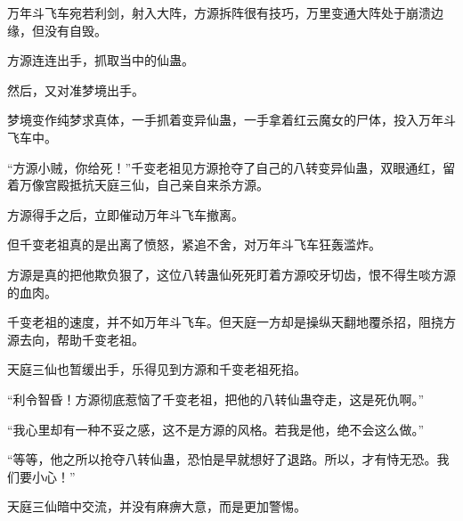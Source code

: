 \begin{this_body}
万年斗飞车宛若利剑，射入大阵，方源拆阵很有技巧，万里变通大阵处于崩溃边缘，但没有自毁。

方源连连出手，抓取当中的仙蛊。

然后，又对准梦境出手。

梦境变作纯梦求真体，一手抓着变异仙蛊，一手拿着红云魔女的尸体，投入万年斗飞车中。

“方源小贼，你给死！”千变老祖见方源抢夺了自己的八转变异仙蛊，双眼通红，留着万像宫殿抵抗天庭三仙，自己亲自来杀方源。

方源得手之后，立即催动万年斗飞车撤离。

但千变老祖真的是出离了愤怒，紧追不舍，对万年斗飞车狂轰滥炸。

方源是真的把他欺负狠了，这位八转蛊仙死死盯着方源咬牙切齿，恨不得生啖方源的血肉。

千变老祖的速度，并不如万年斗飞车。但天庭一方却是操纵天翻地覆杀招，阻挠方源去向，帮助千变老祖。

天庭三仙也暂缓出手，乐得见到方源和千变老祖死掐。

“利令智昏！方源彻底惹恼了千变老祖，把他的八转仙蛊夺走，这是死仇啊。”

“我心里却有一种不妥之感，这不是方源的风格。若我是他，绝不会这么做。”

“等等，他之所以抢夺八转仙蛊，恐怕是早就想好了退路。所以，才有恃无恐。我们要小心！”

天庭三仙暗中交流，并没有麻痹大意，而是更加警惕。

\end{this_body}

